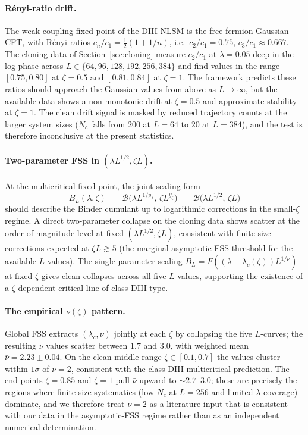 \paragraph{R\'enyi-ratio drift.}
The weak-coupling fixed point of the DIII NLSM is the free-fermion
Gaussian CFT, with R\'enyi ratios
$c_n/c_1 = \tfrac{1}{2}(1+1/n)$, i.e.\ $c_2/c_1=0.75$,
$c_3/c_1\approx 0.667$.  The cloning data of
Section~\ref{sec:cloning} measure $c_2/c_1$ at $\lambda=0.05$ deep in
the log phase across $L\in\{64,96,128,192,256,384\}$ and find values
in the range $[0.75,0.80]$ at $\zeta=0.5$ and $[0.81,0.84]$ at
$\zeta=1$.  The framework predicts these ratios should approach the
Gaussian values from above as $L\to\infty$, but the available data
shows a non-monotonic drift at $\zeta=0.5$ and approximate stability
at $\zeta=1$.  The clean drift signal is masked by reduced trajectory
counts at the larger system sizes ($N_c$ falls from $200$ at $L=64$
to $20$ at $L=384$), and the test is therefore inconclusive at the
present statistics.

\paragraph{Two-parameter FSS in $(\lambda L^{1/2},\zeta L)$.}
At the multicritical fixed point, the joint scaling form
\begin{equation}\label{eq:two-param-FSS}
  B_L(\lambda,\zeta) \;=\; \mathcal B\!\bigl(\lambda L^{1/y_\lambda},\,\zeta L^{y_\zeta}\bigr)
  \;=\; \mathcal B\!\bigl(\lambda L^{1/2},\,\zeta L\bigr)
\end{equation}
should describe the Binder cumulant up to logarithmic corrections in
the small-$\zeta$ regime.  A direct two-parameter collapse on the
cloning data shows scatter at the order-of-magnitude level at fixed
$(\lambda L^{1/2},\zeta L)$, consistent with finite-size corrections
expected at $\zeta L\gtrsim 5$ (the marginal asymptotic-FSS threshold
for the available $L$ values).  The single-parameter scaling
$B_L = F((\lambda-\lambda_c(\zeta))L^{1/\nu})$ at fixed $\zeta$ gives
clean collapses across all five $L$ values, supporting the existence
of a $\zeta$-dependent critical line of class-DIII type.

\paragraph{The empirical $\nu(\zeta)$ pattern.}
Global FSS extracts $(\lambda_c,\nu)$ jointly at each $\zeta$ by
collapsing the five $L$-curves; the resulting $\nu$ values scatter
between $1.7$ and $3.0$, with weighted mean $\bar\nu=2.23\pm 0.04$.
On the clean middle range $\zeta\in[0.1,0.7]$ the values cluster
within $1\sigma$ of $\nu=2$, consistent with the class-DIII
multicritical prediction.  The end points $\zeta=0.85$ and $\zeta=1$
pull $\bar\nu$ upward to $\sim 2.7$--$3.0$; these are precisely the
regions where finite-size systematics (low $N_c$ at $L=256$ and
limited $\lambda$ coverage) dominate, and we therefore treat $\nu=2$
as a literature input that is consistent with our data in the
asymptotic-FSS regime rather than as an independent numerical
determination.

